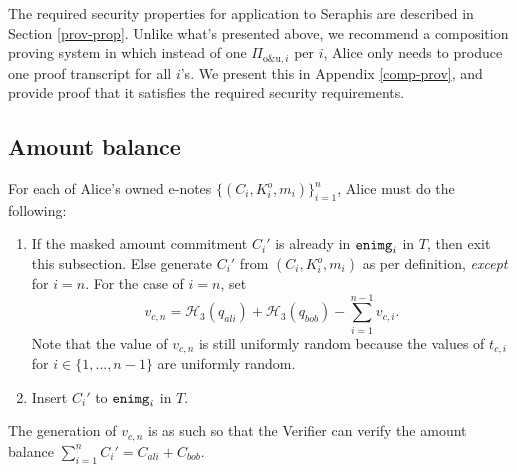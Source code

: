 \documentclass{article}
\begin{document}
The required security properties for application to Seraphis are described in Section \ref{prov-prop}. Unlike what's presented above, we recommend a composition proving system in which instead of one $\Pi_{\text{o\&u}, i}$ per $i$, Alice only needs to produce one proof transcript for all $i$'s. We present this in Appendix \ref{comp-prov}, and provide proof that it satisfies the required security requirements.

\subsection{Amount balance}\label{amt-bal}
For each of Alice's owned e-notes $\{(C_i,K_i^o,m_i)\}_{i=1}^n$, Alice must do the following:
\begin{enumerate}
    \item If the masked amount commitment $C_i'$ is already in ${\tt enimg}_i$ in $T$, then exit this subsection. Else generate $C_i'$ from $(C_i, K_i^o, m_i)$ as per definition, \textit{except} for $i=n$. For the case of $i=n$, set
    $$v_{c,n} = \mathcal{H}_3(q_{ali}) + \mathcal{H}_3(q_{bob}) - \sum_{i=1}^{n-1}{v_{c,i}}.$$
    Note that the value of $v_{c,n}$ is still uniformly random because the values of $t_{c,i}$ for $i\in\{1,\ldots,n-1\}$ are uniformly random.
    \item Insert $C_i'$ to ${\tt enimg}_i$ in $T$.
\end{enumerate}
The generation of $v_{c,n}$ is as such so that the Verifier can verify the amount balance $\sum_{i=1}^n{C_i'}=C_{ali}+C_{bob}$.
\end{document}
